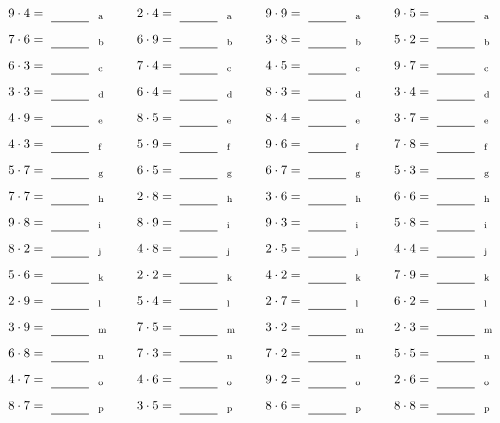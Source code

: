 \documentclass
[
  draft    = true,
  fontsize = 11pt,
  parskip  = half-
]
{scrartcl}
\begin{document}
\par\vfill\par
\begin{align*}
    \pline{9\cdot4}&=\rline{a}
  & \pline{2\cdot4}&=\rline{a}
  & \pline{9\cdot9}&=\rline{a}
  & \pline{9\cdot5}&=\rline{a} \\[1ex]
    \pline{7\cdot6}&=\rline{b}
  & \pline{6\cdot9}&=\rline{b}
  & \pline{3\cdot8}&=\rline{b}
  & \pline{5\cdot2}&=\rline{b} \\[1ex]
    \pline{6\cdot3}&=\rline{c}
  & \pline{7\cdot4}&=\rline{c}
  & \pline{4\cdot5}&=\rline{c}
  & \pline{9\cdot7}&=\rline{c} \\[1ex]
    \pline{3\cdot3}&=\rline{d}
  & \pline{6\cdot4}&=\rline{d}
  & \pline{8\cdot3}&=\rline{d}
  & \pline{3\cdot4}&=\rline{d} \\[1ex]
    \pline{4\cdot9}&=\rline{e}
  & \pline{8\cdot5}&=\rline{e}
  & \pline{8\cdot4}&=\rline{e}
  & \pline{3\cdot7}&=\rline{e} \\[1ex]
    \pline{4\cdot3}&=\rline{f}
  & \pline{5\cdot9}&=\rline{f}
  & \pline{9\cdot6}&=\rline{f}
  & \pline{7\cdot8}&=\rline{f} \\[1ex]
    \pline{5\cdot7}&=\rline{g}
  & \pline{6\cdot5}&=\rline{g}
  & \pline{6\cdot7}&=\rline{g}
  & \pline{5\cdot3}&=\rline{g} \\[1ex]
    \pline{7\cdot7}&=\rline{h}
  & \pline{2\cdot8}&=\rline{h}
  & \pline{3\cdot6}&=\rline{h}
  & \pline{6\cdot6}&=\rline{h} \\[1ex]
    \pline{9\cdot8}&=\rline{i}
  & \pline{8\cdot9}&=\rline{i}
  & \pline{9\cdot3}&=\rline{i}
  & \pline{5\cdot8}&=\rline{i} \\[1ex]
    \pline{8\cdot2}&=\rline{j}
  & \pline{4\cdot8}&=\rline{j}
  & \pline{2\cdot5}&=\rline{j}
  & \pline{4\cdot4}&=\rline{j} \\[1ex]
    \pline{5\cdot6}&=\rline{k}
  & \pline{2\cdot2}&=\rline{k}
  & \pline{4\cdot2}&=\rline{k}
  & \pline{7\cdot9}&=\rline{k} \\[1ex]
    \pline{2\cdot9}&=\rline{l}
  & \pline{5\cdot4}&=\rline{l}
  & \pline{2\cdot7}&=\rline{l}
  & \pline{6\cdot2}&=\rline{l} \\[1ex]
    \pline{3\cdot9}&=\rline{m}
  & \pline{7\cdot5}&=\rline{m}
  & \pline{3\cdot2}&=\rline{m}
  & \pline{2\cdot3}&=\rline{m} \\[1ex]
    \pline{6\cdot8}&=\rline{n}
  & \pline{7\cdot3}&=\rline{n}
  & \pline{7\cdot2}&=\rline{n}
  & \pline{5\cdot5}&=\rline{n} \\[1ex]
    \pline{4\cdot7}&=\rline{o}
  & \pline{4\cdot6}&=\rline{o}
  & \pline{9\cdot2}&=\rline{o}
  & \pline{2\cdot6}&=\rline{o} \\[1ex]
    \pline{8\cdot7}&=\rline{p}
  & \pline{3\cdot5}&=\rline{p}
  & \pline{8\cdot6}&=\rline{p}
  & \pline{8\cdot8}&=\rline{p}
\end{align*}
\end{document}
